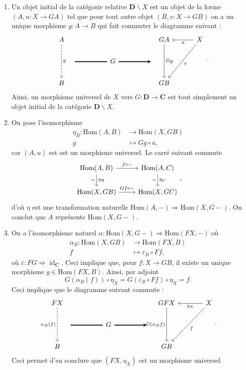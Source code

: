 \documentclass{../../td}
\newcommand\id{\ensuremath{\operatorname{id}}}
\begin{document}
  \begin{enumerate}
    \item Un objet initial  de la catégorie relative $\mathbf{D} \backslash X$ est un objet de la forme $(A, u: X \to GA)$ tel que pour tout autre objet $(B, v : X \to G B)$ on a un unique morphisme $g : A \to B$ qui fait commuter le diagramme suivant :
      \[
  \begin{tikzcd}
    A \arrow[dashed]{dd}{g} &&&& G A \arrow{dd}{G g} & X \arrow{l}{u} \arrow{ddl}{v} \\
    \quad\quad\quad\arrow[-,very thick]{rr}{} && G \arrow[-stealth,very thick]{rr}{} && \quad\quad\quad \\
    B &&&& GB
  \end{tikzcd}
      .\]
      Ainsi, un morphisme universel de $X$ vers $G : \mathbf{D} \to \mathbf{C}$ est tout simplement un objet initial de la catégorie $\mathbf{D} \backslash X$.
    \item On pose l'isomorphisme 
      \begin{align*}
        \eta_B: \mathrm{Hom}(A,B) &\longrightarrow \mathrm{Hom}(X, GB) \\
        g &\longmapsto G g \circ u
      ,\end{align*}
      car $(A, u)$ est est un morphisme universel.
      Le carré suivant commute
      \[
      \begin{tikzcd}
        \mathrm{Hom}(A, B)  \arrow{d}{\eta_B}[swap]{\sim} \arrow{r}{f \circ -} & \mathrm{Hom}(A, C) \arrow{d}{\eta_C}[swap]{\sim} \\
        \mathrm{Hom}(X, GB) \arrow{r}{G f \circ -} & \mathrm{Hom}(X, GC)
      \end{tikzcd}
      ,\] 
      d'où $\eta$ est une transformation naturelle $\mathrm{Hom}(A, -) \Rightarrow \mathrm{Hom}(X, G -)$.
      On conclut que $A$ représente $\mathrm{Hom}(X, G -)$.
    \item 
      On a l'isomorphisme naturel $\alpha : \mathrm{Hom}(X, G -) \Rightarrow \mathrm{Hom}(F X, -)$ où 
      \begin{align*}
        \alpha_B: \mathrm{Hom}(X, G B) &\longrightarrow \mathrm{Hom}(F X, B) \\
        f &\longmapsto \varepsilon_B \circ F f
      ,\end{align*}
      où $\varepsilon : FG \Rightarrow \id_\mathbf{C}$.
      Ceci implique que, pour $f : X \to GB$, il existe un unique morphisme $g \in \mathrm{Hom}(FX, B)$.
      Ainsi, par adjoint \[
      G (\alpha_B(f)) \circ \eta_X = G (\varepsilon_B \circ F f) \circ \eta_X = f
      .\]
      Ceci implique que le diagramme suivant commute : \[
      \begin{tikzcd}
        FX \arrow[dashed,swap]{dd}{\alpha_B(f)} &&&& G FX \arrow[swap]{dd}{G (\alpha_B f)} & X \arrow{l}{\eta_X} \arrow{ddl}{f} \\
        \quad\quad\quad\arrow[-,very thick]{rr}{} && G \arrow[-stealth,very thick]{rr}{} && \quad\quad\quad\quad\quad \\
        B &&&& GB
      \end{tikzcd}
      .\]
      Ceci permet d'en conclure que $(FX, \eta_X)$ est un morphisme universel.
  \end{enumerate}
\end{document}
